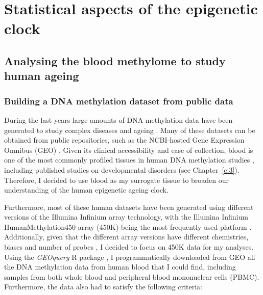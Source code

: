 
\chapter{Statistical aspects of the epigenetic clock}  

\ifpdf
\graphicspath{{Chapter2/Figs/pdf/}}
\else
\graphicspath{{Chapter2/Figs/svg/}}
\fi


\section{Analysing the blood methylome to study human ageing}

\smallskip

\subsection{Building a DNA methylation dataset from public data}

\smallskip

During the last years large amounts of DNA methylation data have been generated to study complex diseases and ageing \cite{Rakyan2011,Flanagan2015}. Many of these datasets can be obtained from public repositories, such as the NCBI-hosted Gene Expression Omnibus (\acrshort{GEO}) \cite{Edgar2002}. Given its clinical accessibility and ease of collection, blood is one of the most commonly profiled tissues in human DNA methylation studies \cite{Flanagan2015}, including published studies on developmental disorders \cite{Aref-Eshghi2018} (see Chapter~\ref{c:3}). Therefore, I decided to use blood as my surrogate tissue to broaden our understanding of the human epigenetic ageing clock.

\bigskip

Furthermore, most of these human datasets have been generated using different versions of the Illumina Infinium array technology, with the Illumina Infinium HumanMethylation450 array (450K) being the most frequently used platform \cite{Flanagan2015}. Additionally, given that the different array versions have different chemistries, biases and number of probes \cite{Bibikova2009,Bibikova2011,Pidsley2016}, I decided to focus on 450K data for my analyses. Using the \textit{GEOquery} R package \cite{Davis2007}, I programmatically downloaded from GEO all the DNA methylation data from human blood that I could find, including samples from both whole blood and peripheral blood mononuclear cells (\acrshort{PBMC}). Furthermore, the data also had to satisfy the following criteria:

